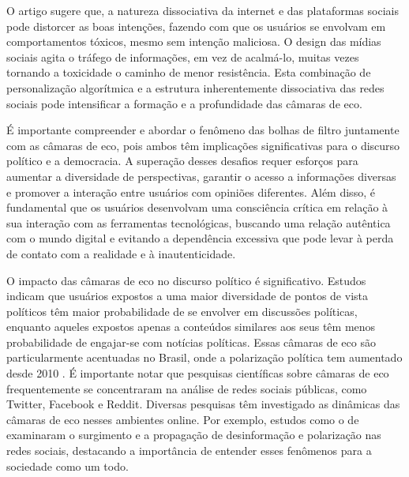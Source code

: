 O artigo  sugere que, a natureza dissociativa da internet e das plataformas sociais pode distorcer as boas intenções, fazendo com que os usuários se envolvam em comportamentos tóxicos, mesmo sem intenção maliciosa. O design das mídias sociais agita o tráfego de informações, em vez de acalmá-lo, muitas vezes tornando a toxicidade o caminho de menor resistência. Esta combinação de personalização algorítmica e a estrutura inherentemente dissociativa das redes sociais pode intensificar a formação e a profundidade das câmaras de eco.

É importante compreender e abordar o fenômeno das bolhas de filtro juntamente com as câmaras de eco, pois ambos têm implicações significativas para o discurso político e a democracia. A superação desses desafios requer esforços para aumentar a diversidade de perspectivas, garantir o acesso a informações diversas e promover a interação entre usuários com opiniões diferentes. Além disso, é fundamental que os usuários desenvolvam uma consciência crítica em relação à sua interação com as ferramentas tecnológicas, buscando uma relação autêntica com o mundo digital e evitando a dependência excessiva que pode levar à perda de contato com a realidade e à inautenticidade.

O impacto das câmaras de eco no discurso político é significativo. Estudos indicam que usuários expostos a uma maior diversidade de pontos de vista políticos têm maior probabilidade de se envolver em discussões políticas, enquanto aqueles expostos apenas a conteúdos similares aos seus têm menos probabilidade de engajar-se com notícias políticas. Essas câmaras de eco são particularmente acentuadas no Brasil, onde a polarização política tem aumentado desde 2010 \cite{2022_Ortellado}. É importante notar que pesquisas científicas sobre câmaras de eco frequentemente se concentraram na análise de redes sociais públicas, como Twitter, Facebook e Reddit. Diversas pesquisas têm investigado as dinâmicas das câmaras de eco nesses ambientes online. Por exemplo, estudos como o de \cite[p. 224]{2016_Vicario} examinaram o surgimento e a propagação de desinformação e polarização nas redes sociais, destacando a importância de entender esses fenômenos para a sociedade como um todo.

